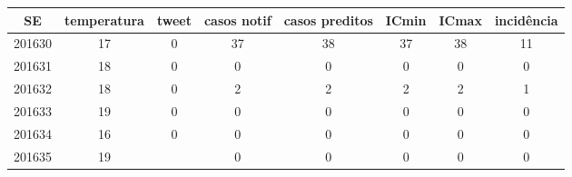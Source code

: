 \begin{tabular}{c|ccccccc}
  \hline
SE & temperatura & tweet & casos notif & casos preditos & ICmin & ICmax & incidência \\ 
  \hline
201630 & 17 & 0 & 37 & 38 & 37 & 38 & 11 \\ 
  201631 & 18 & 0 & 0 & 0 & 0 & 0 & 0 \\ 
  201632 & 18 & 0 & 2 & 2 & 2 & 2 & 1 \\ 
  201633 & 19 & 0 & 0 & 0 & 0 & 0 & 0 \\ 
  201634 & 16 & 0 & 0 & 0 & 0 & 0 & 0 \\ 
  201635 & 19 &  & 0 & 0 & 0 & 0 & 0 \\ 
   \hline
\end{tabular}
